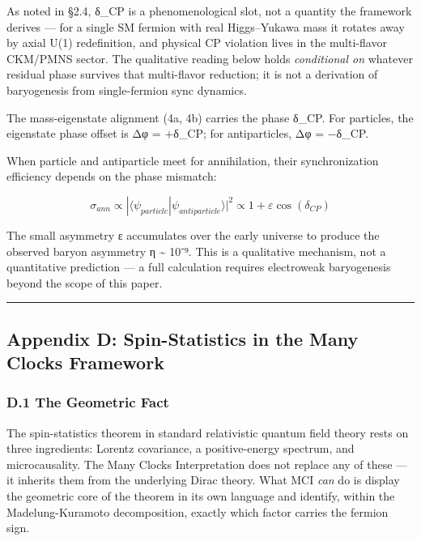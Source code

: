 \documentclass[
]{article}
\begin{document}
As noted in §2.4, δ\_CP is a phenomenological slot, not a quantity the
framework derives --- for a single SM fermion with real Higgs--Yukawa
mass it rotates away by axial U(1) redefinition, and physical CP
violation lives in the multi-flavor CKM/PMNS sector. The qualitative
reading below holds \emph{conditional on} whatever residual phase
survives that multi-flavor reduction; it is not a derivation of
baryogenesis from single-fermion sync dynamics.

The mass-eigenstate alignment (4a, 4b) carries the phase δ\_CP. For
particles, the eigenstate phase offset is Δφ = +δ\_CP; for
antiparticles, Δφ = −δ\_CP.

When particle and antiparticle meet for annihilation, their
synchronization efficiency depends on the phase mismatch:

\[\sigma_{ann} \propto |\langle\psi_{particle}|\psi_{antiparticle}\rangle|^2
\propto 1 + \varepsilon\cos(\delta_{CP})\]

The small asymmetry ε accumulates over the early universe to produce the
observed baryon asymmetry η \textasciitilde{} 10⁻⁹. This is a
qualitative mechanism, not a quantitative prediction --- a full
calculation requires electroweak baryogenesis beyond the scope of this
paper.

\begin{center}\rule{0.5\linewidth}{0.5pt}\end{center}

\subsection{Appendix D: Spin-Statistics in the Many Clocks
Framework}\label{appendix-d-spin-statistics-in-the-many-clocks-framework}

\subsubsection{D.1 The Geometric Fact}\label{d.1-the-geometric-fact}

The spin-statistics theorem in standard relativistic quantum field
theory rests on three ingredients: Lorentz covariance, a positive-energy
spectrum, and microcausality. The Many Clocks Interpretation does not
replace any of these --- it inherits them from the underlying Dirac
theory. What MCI \emph{can} do is display the geometric core of the
theorem in its own language and identify, within the Madelung-Kuramoto
decomposition, exactly which factor carries the fermion sign.
\end{document}
